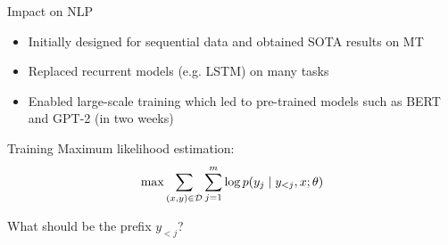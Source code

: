 \documentclass[usenames,dvipsnames,notes,11pt,aspectratio=169,hyperref={colorlinks=true, linkcolor=blue}]{beamer}
\begin{document}
\begin{frame}
    {Impact on NLP}
    \begin{itemize}
        \item Initially designed for sequential data and obtained SOTA results on MT
        \item Replaced recurrent models (e.g. LSTM) on many tasks
        \item Enabled large-scale training which led to pre-trained models such as BERT and GPT-2 (in two weeks)
    \end{itemize}
\end{frame}


\begin{frame}
    {Training}
    Maximum likelihood estimation:\\
    $$
    \max \sum_{(x,y)\in\mathcal{D}} \sum_{j=1}^m \log p(y_j\mid y_{<j}, x; \theta)
    $$
    \pause

    What should be the prefix $y_{<j}$?\\[1ex]\pause
\end{frame}
\end{document}
